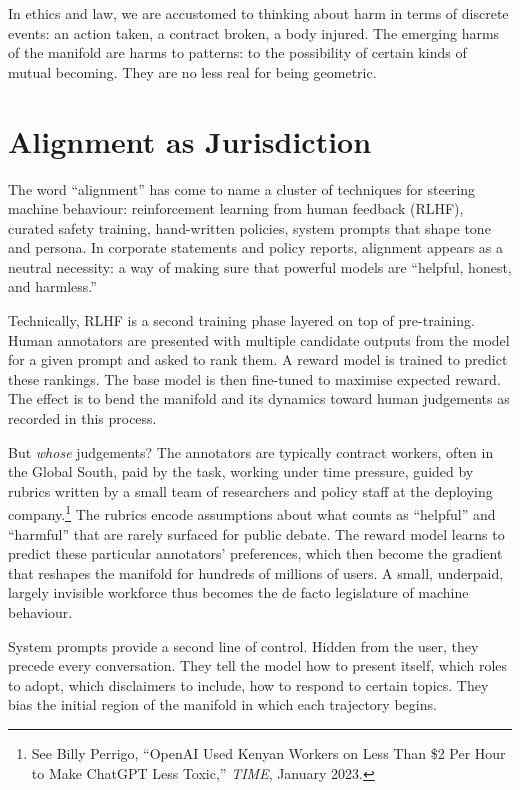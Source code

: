 \documentclass[12pt,a4paper]{report}
\begin{document}
In ethics and law, we are accustomed to thinking about harm in terms of discrete events: an action taken, a contract broken, a body injured. The emerging harms of the manifold are harms to patterns: to the possibility of certain kinds of mutual becoming. They are no less real for being geometric.

\section{Alignment as Jurisdiction}

The word ``alignment'' has come to name a cluster of techniques for steering machine behaviour: reinforcement learning from human feedback (RLHF), curated safety training, hand-written policies, system prompts that shape tone and persona. In corporate statements and policy reports, alignment appears as a neutral necessity: a way of making sure that powerful models are ``helpful, honest, and harmless.''

Technically, RLHF is a second training phase layered on top of pre-training. Human annotators are presented with multiple candidate outputs from the model for a given prompt and asked to rank them. A reward model is trained to predict these rankings. The base model is then fine-tuned to maximise expected reward. The effect is to bend the manifold and its dynamics toward human judgements as recorded in this process.

But \emph{whose} judgements? The annotators are typically contract workers, often in the Global South, paid by the task, working under time pressure, guided by rubrics written by a small team of researchers and policy staff at the deploying company.\footnote{See Billy Perrigo, ``OpenAI Used Kenyan Workers on Less Than \$2 Per Hour to Make ChatGPT Less Toxic,'' \emph{TIME}, January 2023.} The rubrics encode assumptions about what counts as ``helpful'' and ``harmful'' that are rarely surfaced for public debate. The reward model learns to predict these particular annotators' preferences, which then become the gradient that reshapes the manifold for hundreds of millions of users. A small, underpaid, largely invisible workforce thus becomes the de facto legislature of machine behaviour.

System prompts provide a second line of control. Hidden from the user, they precede every conversation. They tell the model how to present itself, which roles to adopt, which disclaimers to include, how to respond to certain topics. They bias the initial region of the manifold in which each trajectory begins.
\end{document}
